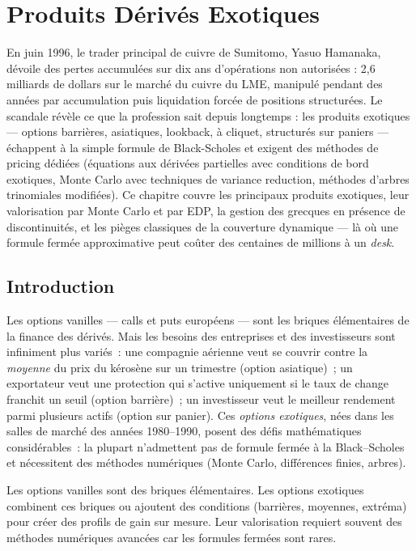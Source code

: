 \chapter{Produits D\'eriv\'es Exotiques}
\label{ch:exotiques}

En juin 1996, le trader principal de cuivre de Sumitomo, Yasuo Hamanaka, dévoile des pertes accumulées sur dix ans d'opérations non autorisées : 2,6 milliards de dollars sur le marché du cuivre du LME, manipulé pendant des années par accumulation puis liquidation forcée de positions structurées. Le scandale révèle ce que la profession sait depuis longtemps : les produits exotiques --- options barrières, asiatiques, lookback, à cliquet, structurés sur paniers --- échappent à la simple formule de Black-Scholes et exigent des méthodes de pricing dédiées (équations aux dérivées partielles avec conditions de bord exotiques, Monte Carlo avec techniques de variance reduction, méthodes d'arbres trinomiales modifiées). Ce chapitre couvre les principaux produits exotiques, leur valorisation par Monte Carlo et par EDP, la gestion des grecques en présence de discontinuités, et les pièges classiques de la couverture dynamique --- là où une formule fermée approximative peut coûter des centaines de millions à un \emph{desk}.

\section{Introduction}

Les options vanilles --- calls et puts europ\'eens --- sont les briques \'el\'ementaires de la finance des d\'eriv\'es. Mais les besoins des entreprises et des investisseurs sont infiniment plus vari\'es~: une compagnie a\'erienne veut se couvrir contre la \emph{moyenne} du prix du k\'eros\`ene sur un trimestre (option asiatique)~; un exportateur veut une protection qui s'active uniquement si le taux de change franchit un seuil (option barri\`ere)~; un investisseur veut le meilleur rendement parmi plusieurs actifs (option sur panier). Ces \emph{options exotiques}, n\'ees dans les salles de march\'e des ann\'ees 1980--1990, posent des d\'efis math\'ematiques consid\'erables~: la plupart n'admettent pas de formule ferm\'ee \`a la Black--Scholes et n\'ecessitent des m\'ethodes num\'eriques (Monte Carlo, diff\'erences finies, arbres).

\begin{intuition}
Les options vanilles sont des briques \'el\'ementaires. Les options exotiques
combinent ces briques ou ajoutent des conditions (barri\`eres, moyennes,
extr\'ema) pour cr\'eer des profils de gain sur mesure. Leur valorisation
requiert souvent des m\'ethodes num\'eriques avanc\'ees car les formules
ferm\'ees sont rares.
\end{intuition}

